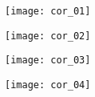 \ifprof

\begin{center}
\texttt{[image: cor\_01]}
\end{center}

\begin{center}
\texttt{[image: cor\_02]}
\end{center}

\begin{center}
\texttt{[image: cor\_03]}
\end{center}

\begin{center}
\texttt{[image: cor\_04]}
\end{center}
\else
\fi